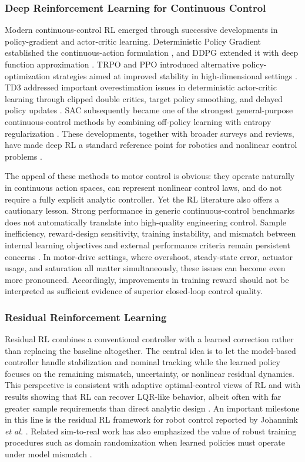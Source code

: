\documentclass[conference]{IEEEtran}
\begin{document}
\subsubsection{Deep Reinforcement Learning for Continuous Control}
Modern continuous-control RL emerged through successive developments in policy-gradient and actor-critic learning. Deterministic Policy Gradient established the continuous-action formulation \cite{silver2014}, and DDPG extended it with deep function approximation \cite{lillicrap2015}. TRPO and PPO introduced alternative policy-optimization strategies aimed at improved stability in high-dimensional settings \cite{schulman2015,schulman2017}. TD3 addressed important overestimation issues in deterministic actor-critic learning through clipped double critics, target policy smoothing, and delayed policy updates \cite{fujimoto2018}. SAC subsequently became one of the strongest general-purpose continuous-control methods by combining off-policy learning with entropy regularization \cite{haarnoja2018}. These developments, together with broader surveys and reviews, have made deep RL a standard reference point for robotics and nonlinear control problems \cite{kormushev2013,francoislavet2018,recht2019,motorreview2024}.

The appeal of these methods to motor control is obvious: they operate naturally in continuous action spaces, can represent nonlinear control laws, and do not require a fully explicit analytic controller. Yet the RL literature also offers a cautionary lesson. Strong performance in generic continuous-control benchmarks does not automatically translate into high-quality engineering control. Sample inefficiency, reward-design sensitivity, training instability, and mismatch between internal learning objectives and external performance criteria remain persistent concerns \cite{recht2019,francoislavet2018}. In motor-drive settings, where overshoot, steady-state error, actuator usage, and saturation all matter simultaneously, these issues can become even more pronounced. Accordingly, improvements in training reward should not be interpreted as sufficient evidence of superior closed-loop control quality.

\subsubsection{Residual Reinforcement Learning}
Residual RL combines a conventional controller with a learned correction rather than replacing the baseline altogether. The central idea is to let the model-based controller handle stabilization and nominal tracking while the learned policy focuses on the remaining mismatch, uncertainty, or nonlinear residual dynamics. This perspective is consistent with adaptive optimal-control views of RL \cite{lewis2012} and with results showing that RL can recover LQR-like behavior, albeit often with far greater sample requirements than direct analytic design \cite{fazel2018}. An important milestone in this line is the residual RL framework for robot control reported by Johannink \emph{et al.} \cite{johannink2019}. Related sim-to-real work has also emphasized the value of robust training procedures such as domain randomization when learned policies must operate under model mismatch \cite{tobin2017,peng2018}.
\end{document}

